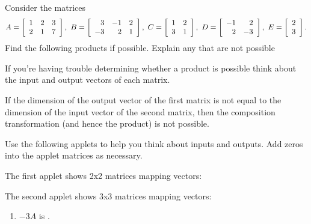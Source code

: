\documentclass{ximera}
\author{Zack Reed}
\begin{document}
\begin{exercise}

    Consider the matrices
    \begin{equation*}
      A = \startmat{rrr}
        1 & 2 & 3 \\
        2 & 1 & 7
      \stopmat,\quad
      B = \startmat{rrr}
        3 & -1 & 2 \\
        -3 & 2 & 1
      \stopmat,\quad
      C = \startmat{rr}
        1 & 2 \\
        3 & 1
      \stopmat,\quad
      D = \startmat{rr}
        -1 & 2 \\
        2 & -3
      \stopmat,\quad
      E = \startmat{r}
        2 \\
        3
      \stopmat.
    \end{equation*}
    Find the following products if possible. Explain any that are not possible

\begin{hint}

    If you're having trouble determining whether a product is possible think about the input and output vectors of each matrix. 

    If the dimension of the output vector of the first matrix is not equal to the dimension of the input vector of the second matrix, then the composition transformation (and hence the product) is not possible.

    Use the following applets to help you think about inputs and outputs. Add zeros into the applet matrices as necessary.

    The first applet shows 2x2 matrices mapping vectors:

    \begin{center}
    

    \end{center}

    The second applet shows 3x3 matrices mapping vectors:

    \begin{center}
    

    \end{center}

\end{hint}

    \begin{enumerate}
      \item $-3A$ is .
      \begin{problem}


\end{problem}
\end{enumerate}
\end{exercise}
\end{document}
